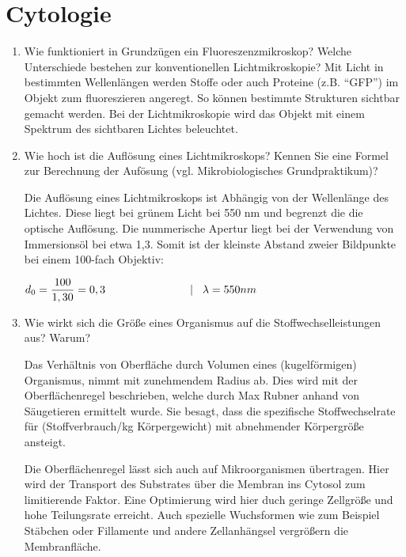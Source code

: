 
\section{Cytologie}
\label{sec:cytologie}
\begin{enumerate}
	\item Wie funktioniert in Grundzügen ein Fluoreszenzmikroskop? Welche Unterschiede bestehen zur konventionellen Lichtmikroskopie?				
		Mit Licht in bestimmten Wellenlängen werden Stoffe
		oder auch Proteine (z.B. ``GFP'') im Objekt zum	fluoreszieren angeregt.
		So können bestimmte Strukturen sichtbar gemacht werden.
		Bei der Lichtmikroskopie wird das Objekt mit einem Spektrum des sichtbaren Lichtes
		beleuchtet.

	\item\label{tab:quest_cyt_resolution} Wie hoch ist die Auflösung eines Lichtmikroskops?
		Kennen Sie eine Formel zur Berechnung der Aufösung (vgl. Mikrobiologisches Grundpraktikum)?

	Die Auflösung eines Lichtmikroskops ist Abhängig von der Wellenlänge des Lichtes.
	Diese liegt bei grünem Licht bei 550 nm und begrenzt die die optische Auflösung.
	Die nummerische Apertur liegt bei der Verwendung von Immersionsöl bei etwa 1,3.
	Somit ist der kleinste Abstand zweier Bildpunkte bei einem 100-fach Objektiv:

	\begin{center}
	\begin{math}
		d_{0} = \dfrac{100}{1,30} = 0,3 \hspace{27mm} |\hspace{3mm} \lambda = 550 nm
	\end{math}
	\end{center}

	\item Wie wirkt sich die Größe eines Organismus auf die Stoffwechselleistungen aus? Warum?
		
		Das Verhältnis von Oberfläche durch Volumen eines (kugelförmigen) Organismus,
		nimmt mit zunehmendem Radius ab.
		Dies wird mit der Oberflächenregel beschrieben, welche durch Max Rubner anhand von Säugetieren ermittelt wurde.
		Sie besagt, dass die spezifische Stoffwechselrate für (Stoffverbrauch/kg Körpergewicht)
		mit abnehmender Körpergröße ansteigt.

		Die Oberflächenregel lässt sich auch auf Mikroorganismen übertragen.
		Hier wird der Transport des Substrates über die Membran ins Cytosol zum limitierende Faktor.
		Eine Optimierung wird hier duch geringe Zellgröße und hohe Teilungsrate erreicht.
		Auch spezielle Wuchsformen wie zum Beispiel Stäbchen
		oder Fillamente und andere Zellanhängsel vergrößern die Membranfläche.


\end{enumerate}
